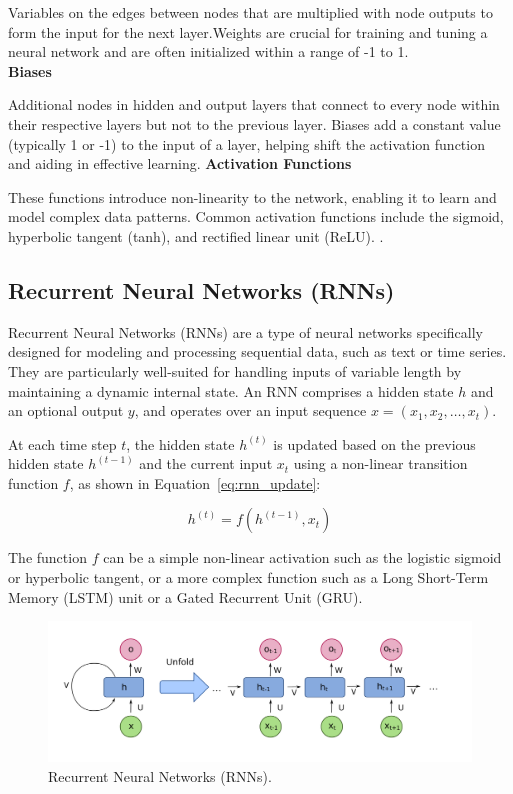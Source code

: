 Variables on the edges between nodes that are multiplied with node outputs to form the input for the next layer.Weights are crucial for training and tuning a neural network and are often initialized within a range of -1 to 1.  \\
\textbf{Biases} 


Additional nodes in hidden and output layers that connect to every node within their respective layers but not to the previous layer. Biases add a constant value (typically 1 or -1) to the input of a layer, helping shift the activation function and aiding in effective learning. 
\textbf{Activation Functions} 


These functions introduce non-linearity to the network, enabling it to learn and model complex data patterns. Common activation functions include the sigmoid, hyperbolic tangent (tanh), and rectified linear unit (ReLU). \cite{taylor2017neural}.

\subsection{ Recurrent Neural Networks (RNNs)}
Recurrent Neural Networks (RNNs) are a type of neural networks specifically designed for modeling and processing sequential data, such as text or time series. They are particularly well-suited for handling inputs of variable length by maintaining a dynamic internal state. An RNN comprises a hidden state $h$ and an optional output $y$, and operates over an input sequence $x = (x_1, x_2, \dots, x_t)$.

At each time step $t$, the hidden state $h^{(t)}$ is updated based on the previous hidden state $h^{(t-1)}$ and the current input $x_t$ using a non-linear transition function $f$, as shown in Equation~\ref{eq:rnn_update}:

\begin{equation}
	h^{(t)} = f(h^{(t-1)}, x_t)
	\label{eq:rnn_update}
\end{equation}

The function $f$ can be a simple non-linear activation such as the logistic sigmoid or hyperbolic tangent, or a more complex function such as a Long Short-Term Memory (LSTM) unit or a Gated Recurrent Unit (GRU).
\begin{figure}[htbp]
	
	\centerline{\includegraphics[width=1\linewidth]{Figures/RNN.png}}
	\caption{Recurrent Neural Networks (RNNs).}
	\label{RNN.png}
\end{figure}



